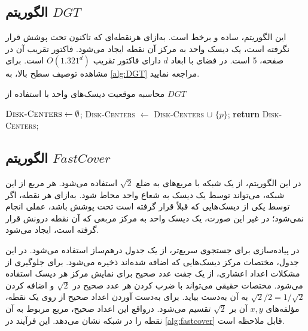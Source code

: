 \documentclass[12pt]{article}
\begin{document}
\subsection{
الگوریتم $DGT$
}

این الگوریتم، ساده و برخط است. به‌ازای هرنقطه‌ای که تاکنون تحت پوشش قرار نگرفته است، یک دیسک واحد به مرکز آن نقطه ایجاد می‌شود. فاکتور تقریب آن در صفحه، 5 است. در فضای با ابعاد $d$ دارای فاکتور تقریب $O(1.321^{d})$ است. برای مشاهده توصیف سطح بالا، به
\cref{alg:DGT}
مراجعه نمایید.

\begin{algorithm}[H]
\singlespacing
\caption{
محاسبه موقعیت دیسک‌های واحد با استفاده از $DGT$
} 
\label{alg:DGT} 
\begin{latin}
\begin{algorithmic}[1] 
   \STATE $\textsc{Disk-Centers} \leftarrow \emptyset$;
            \STATE \textsc{Disk-Centers} $\leftarrow$ \textsc{Disk-Centers} $\cup$ $\{p\}$; 
        \ENDIF
   \ENDFOR
   \STATE \textbf{return} \textsc{Disk-Centers};
   \end{algorithmic}
\end{latin}
\end{algorithm}


\subsection{
الگوریتم $FastCover$
}

در این الگوریتم، از یک شبکه%
با مربع‌های به ضلع $\sqrt{2}$ استفاده می‌شود. هر مربع از این شبکه، می‌تواند توسط یک دیسک به شعاع واحد محاط شود. به‌ازای هر نقطه، اگر توسط یکی از دیسک‌هایی که قبلاً قرار گرفته است تحت پوشش باشد، عملی انجام نمی‌شود؛ در غیر این صورت، یک دیسک واحد به مرکز مربعی که آن نقطه درونش قرار گرفته است، ایجاد می‌شود.

در پیاده‌سازی برای جستجوی سریع‌تر، از یک جدول درهم‌ساز%
استفاده می‌شود. در این جدول، مختصات مرکز دیسک‌هایی که اضافه شده‌اند ذخیره می‌شود. برای جلوگیری از مشکلات اعداد اعشاری، از یک جفت عدد صحیح برای نمایش مرکز هر دیسک استفاده می‌شود. مختصات حقیقی می‌تواند با ضرب کردن هر عدد صحیح در $\sqrt{2}$ و اضافه کردن $\sqrt{2} / 2 = 1 / \sqrt{2}$ به آن به‌دست بیاید. برای به‌دست آوردن اعداد صحیح از روی یک نقطه، مؤلفه‌های $x,y$ آن بر $\sqrt{2}$ تقسیم می‌شود. درواقع این اعداد صحیح، مربع مربوط به آن نقطه را در شبکه نشان می‌دهد. این فرآیند در
\cref{alg:fastcover}
قابل ملاحظه است.
\end{document}
